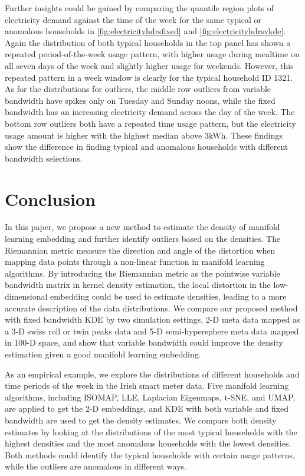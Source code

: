 \documentclass[11pt,a4paper,]{article}
\begin{document}
Further insights could be gained by comparing the quantile region plots
of electricity demand against the time of the week for the same typical
or anomalous households in \autoref{fig:electricityhdrsfixed} and
\autoref{fig:electricityhdrsvkde}. Again the distribution of both
typical households in the top panel has shown a repeated
period-of-the-week usage pattern, with higher usage during mealtime on
all seven days of the week and slightly higher usage for weekends.
However, this repeated pattern in a week window is clearly for the
typical household ID 1321. As for the distributions for outliers, the
middle row outliers from variable bandwidth have spikes only on Tuesday
and Sunday noons, while the fixed bandwidth has an increasing
electricity demand across the day of the week. The bottom row outliers
both have a repeated time usage pattern, but the electricity usage
amount is higher with the highest median above 3kWh. These findings show
the difference in finding typical and anomalous households with
different bandwidth selections.

\hypertarget{conclusion}{%
\section{Conclusion}\label{conclusion}}

In this paper, we propose a new method to estimate the density of
manifold learning embedding and further identify outliers based on the
densities. The Riemannian metric measure the direction and angle of the
distortion when mapping data points through a non-linear function in
manifold learning algorithms. By introducing the Riemannian metric as
the pointwise variable bandwidth matrix in kernel density estimation,
the local distortion in the low-dimensional embedding could be used to
estimate densities, leading to a more accurate description of the data
distributions. We compare our proposed method with fixed bandwidth KDE
by two simulation settings, 2-D meta data mapped as a 3-D swiss roll or
twin peaks data and 5-D semi-hypersphere meta data mapped in 100-D
space, and show that variable bandwidth could improve the density
estimation given a good manifold learning embedding.

As an empirical example, we explore the distributions of different
households and time periods of the week in the Irish smart meter data.
Five manifold learning algorithms, including ISOMAP, LLE, Laplacian
Eigenmaps, t-SNE, and UMAP, are applied to get the 2-D embeddings, and
KDE with both variable and fixed bandwidth are used to get the density
estimates. We compare both density estimates by looking at the
distributions of the most typical households with the highest densities
and the most anomalous households with the lowest densities. Both
methods could identify the typical households with certain usage
patterns, while the outliers are anomalous in different ways.
\end{document}
